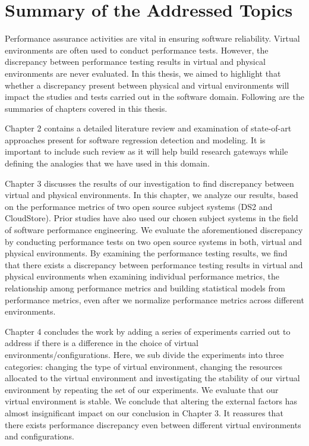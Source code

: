 



\section{Summary of the Addressed Topics}


Performance assurance activities are vital in ensuring software reliability. Virtual environments are often used to conduct performance tests. However, the discrepancy between performance testing results in virtual and physical environments are never evaluated. In this thesis, we aimed to highlight that whether a discrepancy present between physical and virtual environments will impact the studies and tests carried out in the software domain. Following are the summaries of chapters covered in this thesis.

Chapter 2 contains a detailed literature review and examination of state-of-art approaches present for software regression detection and modeling. It is important to include such review as it will help build research gateways while defining the analogies that we have used in this domain. 

Chapter 3 discusses the results of our investigation to find discrepancy between virtual and physical environments. In this chapter, we analyze our results, based on the performance metrics of two open source subject systems (DS2 and CloudStore). Prior studies have also used our chosen subject systems in the field of software performance engineering. We evaluate the aforementioned discrepancy by conducting performance tests on two open source systems in both, virtual and physical environments. By examining the performance testing results, we find that there exists a discrepancy between performance testing results in virtual and physical environments when examining individual performance metrics, the relationship among performance metrics and building statistical models from performance metrics, even after we normalize performance metrics across different environments. 

Chapter 4 concludes the work by adding a series of experiments carried out to address if there is a difference in the choice of virtual environments/configurations. Here, we sub divide the experiments into three categories: changing the type of virtual environment, changing the resources allocated to the virtual environment and investigating the stability of our virtual environment by repeating the set of our experiments. We evaluate that our virtual environment is stable. We conclude that altering the external factors has almost insignificant impact on our conclusion in Chapter 3. It reassures that there exists performance discrepancy even between different virtual environments and configurations.  
 
